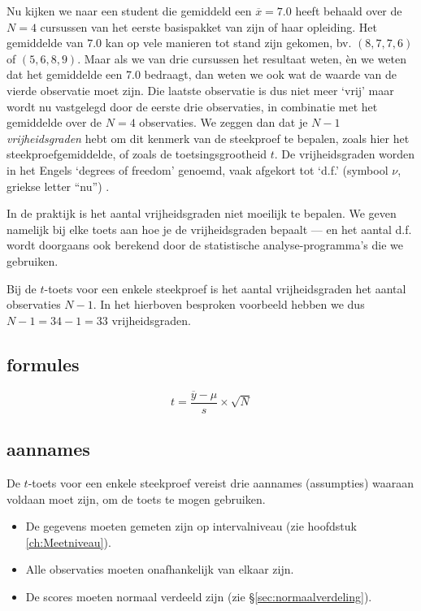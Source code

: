 \documentclass[
]{book}
\begin{document}
Nu kijken we naar een student die gemiddeld een \(\overline{x}=7.0\) heeft
behaald over de \(N=4\) cursussen van het eerste basispakket van zijn of
haar opleiding. Het gemiddelde van \(7.0\) kan op vele manieren tot stand
zijn gekomen, bv. \((8,7,7,6)\) of \((5,6,8,9)\). Maar als we van drie
cursussen het resultaat weten, èn we weten dat het gemiddelde een 7.0
bedraagt, dan weten we ook wat de waarde van de vierde observatie moet
zijn. Die laatste observatie is dus niet meer `vrij' maar wordt nu
vastgelegd door de eerste drie observaties, in combinatie met het
gemiddelde over de \(N=4\) observaties. We zeggen dan dat je \(N-1\)
\emph{vrijheidsgraden} hebt om dit kenmerk van de steekproef te bepalen,
zoals hier het steekproefgemiddelde, of zoals de toetsingsgrootheid \(t\).
De vrijheidsgraden worden in het Engels `degrees of freedom' genoemd,
vaak afgekort tot `d.f.' (symbool \(\nu\), griekse letter ``nu'') .

In de praktijk is het aantal vrijheidsgraden niet moeilijk te bepalen.
We geven namelijk bij elke toets aan hoe je de vrijheidsgraden bepaalt
--- en het aantal d.f. wordt doorgaans ook berekend door de statistische
analyse-programma's die we gebruiken.

Bij de \(t\)-toets voor een enkele steekproef is het aantal vrijheidsgraden het
aantal observaties \(N-1\). In het hierboven besproken voorbeeld hebben we
dus \(N-1 = 34-1 = 33\) vrijheidsgraden.

\hypertarget{sec:formules13-1}{%
\subsection{formules}\label{sec:formules13-1}}

\begin{equation}
  t = \frac{ \overline{y}-\mu} { s } \times \sqrt{N}
  \label{eq:t-onesample}
\end{equation}

\hypertarget{sec:ttoets-aannames}{%
\subsection{aannames}\label{sec:ttoets-aannames}}

De \(t\)-toets voor een enkele steekproef vereist drie aannames (assumpties) waaraan
voldaan moet zijn, om de toets te mogen gebruiken.

\begin{itemize}
\item
  De gegevens moeten gemeten zijn op intervalniveau (zie
  hoofdstuk \ref{ch:Meetniveau}).
\item
  Alle observaties moeten onafhankelijk van elkaar zijn.
\item
  De scores moeten normaal verdeeld zijn (zie
  §\ref{sec:normaalverdeling}).
\end{itemize}
\end{document}
